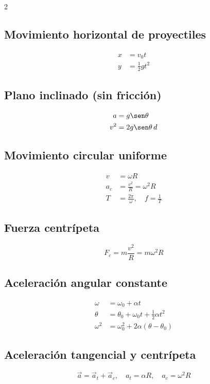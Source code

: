 \documentclass[10pt]{article}
\begin{document}
\begin{multicols}{2}
\subsection*{Movimiento horizontal de proyectiles}
\begin{align*}
    x &= v_0 t \\
    y &= \tfrac{1}{2} g t^2
\end{align*}

\subsection*{Plano inclinado (sin fricción)}
\begin{align*}
    a &= g \sen\theta \\
    v^2 &= 2 g \sen\theta \, d
\end{align*}

\subsection*{Movimiento circular uniforme}
\begin{align*}
    v &= \omega R \\
    a_c &= \frac{v^2}{R} = \omega^2 R \\
    T &= \frac{2\pi}{\omega},\quad f = \frac{1}{T}
\end{align*}

\subsection*{Fuerza centrípeta}
\[
F_c = m \frac{v^2}{R} = m \omega^2 R
\]

\subsection*{Aceleración angular constante}
\begin{align*}
    \omega &= \omega_0 + \alpha t \\
    \theta &= \theta_0 + \omega_0 t + \tfrac{1}{2} \alpha t^2 \\
    \omega^2 &= \omega_0^2 + 2\alpha (\theta - \theta_0)
\end{align*}

\subsection*{Aceleración tangencial y centrípeta}
\[
\vec{a} = \vec{a}_t + \vec{a}_c,\quad a_t = \alpha R,\quad a_c = \omega^2 R
\]


\end{multicols}
\end{document}
